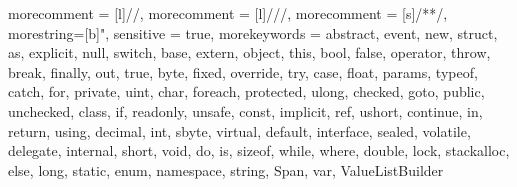 \newcommand\eqby[1]{\mathrel{\stackrel{\makebox[0pt]{\mbox{\normalfont\tiny #1}}}{=}}}
\newcommand\eqbyref[1]{\mathrel{\stackrel{\makebox[0pt]{\mbox{\normalfont\tiny\eqref{#1}}}}{=}}}
\newcommand\restr[2]{{%
  \left.\kern-\nulldelimiterspace %
  #1 %
  \vphantom{\big|} %
  \right|_{#2} %
  }}

\newcommand{\csharp}{\textsc{C\#}}
\newcommand{\java}{\textsc{Java}}
\newcommand{\scala}{\textsc{Scala}}
\newcommand{\dotnet}{\textsc{.NET}}
\newcommand{\clang}{\textsc{C}}
\newcommand{\cpplang}{\textsc{C++}}
\newcommand{\coq}{\textsc{Coq}}

{
 morecomment = [l]{//},
 morecomment = [l]{///},
 morecomment = [s]{/*}{*/},
 morestring=[b]",
 sensitive = true,
 morekeywords = {abstract,  event,  new,  struct,
  as,  explicit,  null,  switch,
  base,  extern,  object,  this,
  bool,  false,  operator,  throw,
  break,  finally,  out,  true,
  byte,  fixed,  override,  try,
  case,  float,  params,  typeof,
  catch,  for,  private,  uint,
  char,  foreach,  protected,  ulong,
  checked,  goto,  public,  unchecked,
  class,  if,  readonly,  unsafe,
  const,  implicit,  ref,  ushort,
  continue,  in,  return,  using,
  decimal,  int,  sbyte,  virtual,
  default,  interface,  sealed,  volatile,
  delegate,  internal,  short,  void,
  do,  is,  sizeof,  while, where,
  double,  lock,  stackalloc,
  else,  long,  static,
  enum,  namespace,  string, Span, var,
  ValueListBuilder}
}



\lstset{
   language=mycpp,
   extendedchars=true,
   basicstyle=\small\ttfamily,
   showstringspaces=false,
   showspaces=false,
   tabsize=2,
   breaklines=true,
   showtabs=false
}

